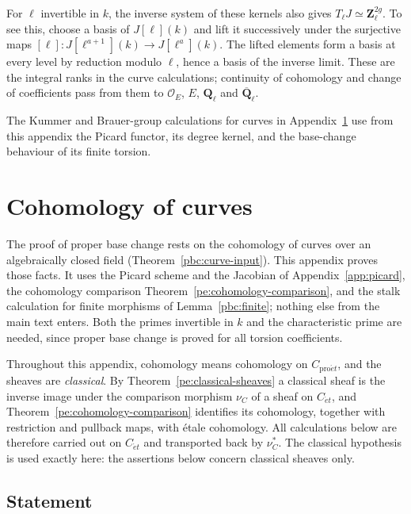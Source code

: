 \documentclass[11pt,a4paper]{article}
\numberwithin{equation}{section}
\theoremstyle{definition}
\theoremstyle{remark}
\newcommand{\Qbar}{\overline{\mathbf Q}_\ell}
\newcommand{\Ql}{\mathbf Q_\ell}
\newcommand{\Zl}{\mathbf Z_\ell}
\newcommand{\et}{\acute{e}t}
\newcommand{\proet}{\mathrm{pro}\acute{e}t}
\begin{document}
For $\ell$ invertible in $k$, the inverse system of these kernels
also gives $T_\ell J\simeq\Zl^{2g}$. To see this, choose a basis of
$J[\ell](k)$ and lift it successively under the surjective maps
$[\ell]:J[\ell^{a+1}](k)\to J[\ell^a](k)$. The lifted elements form
a basis at every level by reduction modulo $\ell$, hence a basis of
the inverse limit. These are the integral ranks in the curve
calculations; continuity of cohomology and change of coefficients
pass from them to $\mathcal O_E$, $E$, $\Ql$ and $\Qbar$.

The Kummer and Brauer-group calculations for curves in
Appendix~\ref{app:curves} use from this appendix the Picard functor,
its degree kernel, and the base-change behaviour of its finite torsion.

\section{Cohomology of curves}
\label{app:curves}

The proof of proper base change rests on the cohomology of curves
over an algebraically closed field (Theorem~\ref{pbc:curve-input}).
This appendix proves those facts.  It uses the Picard scheme and the
Jacobian of Appendix~\ref{app:picard}, the cohomology comparison
Theorem~\ref{pe:cohomology-comparison}, and the stalk calculation for
finite morphisms of Lemma~\ref{pbc:finite}; nothing else from the main
text enters.  Both the primes invertible in $k$ and the characteristic
prime are needed, since proper base change is proved for all torsion
coefficients.

Throughout this appendix, cohomology means cohomology on $C_{\proet}$,
and the sheaves are \emph{classical}.  By
Theorem~\ref{pe:classical-sheaves} a classical sheaf is the inverse
image under the comparison morphism $\nu_C$ of a sheaf on $C_{\et}$,
and Theorem~\ref{pe:cohomology-comparison} identifies its cohomology,
together with restriction and pullback maps, with \'etale cohomology.
All calculations below are therefore carried out on $C_{\et}$ and
transported back by $\nu_C^*$.  The classical hypothesis is used
exactly here: the assertions below concern classical sheaves only.

\subsection{Statement}
\end{document}
